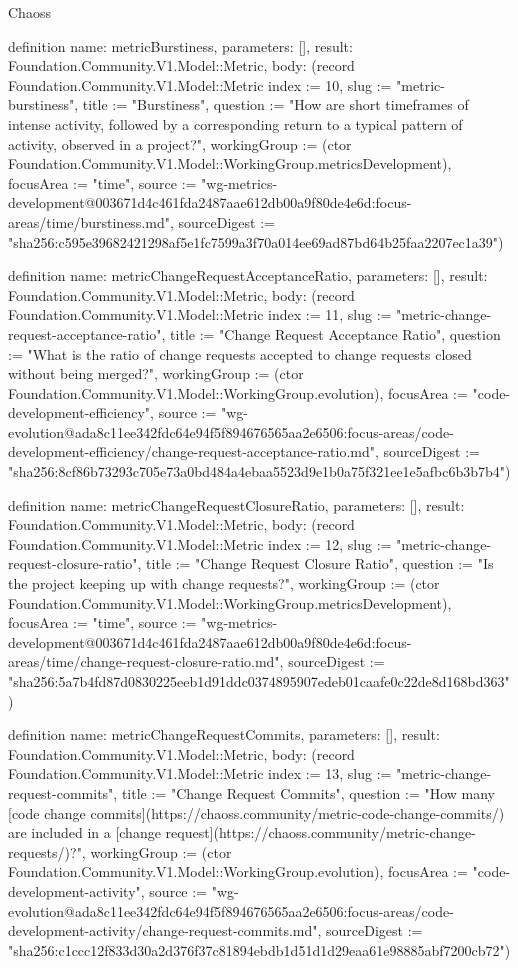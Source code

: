 \begin{lexlean}{Chaoss}
\begin{semanticmodule}
definition{
  name: metricBurstiness,
  parameters: [],
  result: Foundation.Community.V1.Model::Metric,
  body: (record Foundation.Community.V1.Model::Metric {index := 10, slug := "metric-burstiness", title := "Burstiness", question := "How are short timeframes of intense activity, followed by a corresponding return to a typical pattern of activity, observed in a project?", workingGroup := (ctor Foundation.Community.V1.Model::WorkingGroup.metricsDevelopment), focusArea := "time", source := "wg-metrics-development@003671d4c461fda2487aae612db00a9f80de4e6d:focus-areas/time/burstiness.md", sourceDigest := "sha256:c595e39682421298af5e1fc7599a3f70a014ee69ad87bd64b25faa2207ec1a39"})
}

definition{
  name: metricChangeRequestAcceptanceRatio,
  parameters: [],
  result: Foundation.Community.V1.Model::Metric,
  body: (record Foundation.Community.V1.Model::Metric {index := 11, slug := "metric-change-request-acceptance-ratio", title := "Change Request Acceptance Ratio", question := "What is the ratio of change requests accepted to change requests closed without being merged?", workingGroup := (ctor Foundation.Community.V1.Model::WorkingGroup.evolution), focusArea := "code-development-efficiency", source := "wg-evolution@ada8c11ee342fdc64e94f5f894676565aa2e6506:focus-areas/code-development-efficiency/change-request-acceptance-ratio.md", sourceDigest := "sha256:8cf86b73293c705e73a0bd484a4ebaa5523d9e1b0a75f321ee1e5afbc6b3b7b4"})
}

definition{
  name: metricChangeRequestClosureRatio,
  parameters: [],
  result: Foundation.Community.V1.Model::Metric,
  body: (record Foundation.Community.V1.Model::Metric {index := 12, slug := "metric-change-request-closure-ratio", title := "Change Request Closure Ratio", question := "Is the project keeping up with change requests?", workingGroup := (ctor Foundation.Community.V1.Model::WorkingGroup.metricsDevelopment), focusArea := "time", source := "wg-metrics-development@003671d4c461fda2487aae612db00a9f80de4e6d:focus-areas/time/change-request-closure-ratio.md", sourceDigest := "sha256:5a7b4fd87d0830225eeb1d91ddc0374895907edeb01caafe0c22de8d168bd363"})
}

definition{
  name: metricChangeRequestCommits,
  parameters: [],
  result: Foundation.Community.V1.Model::Metric,
  body: (record Foundation.Community.V1.Model::Metric {index := 13, slug := "metric-change-request-commits", title := "Change Request Commits", question := "How many [code change commits](https://chaoss.community/metric-code-change-commits/) are included in a [change request](https://chaoss.community/metric-change-requests/)?", workingGroup := (ctor Foundation.Community.V1.Model::WorkingGroup.evolution), focusArea := "code-development-activity", source := "wg-evolution@ada8c11ee342fdc64e94f5f894676565aa2e6506:focus-areas/code-development-activity/change-request-commits.md", sourceDigest := "sha256:c1ccc12f833d30a2d376f37c81894ebdb1d51d1d29eaa61e98885abf7200cb72"})
}


\end{semanticmodule}
\end{lexlean}
